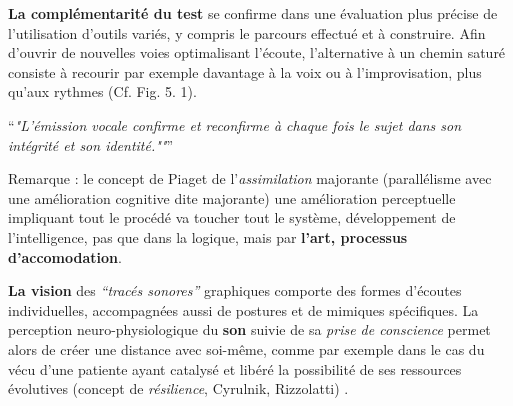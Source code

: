 
 \textbf{La complémentarité du test} se confirme dans une évaluation plus
 précise de l'utilisation d'outils variés, y compris  le parcours effectué et à
 construire.
 Afin d'ouvrir de nouvelles
 voies optimalisant l'écoute, l'alternative à un chemin saturé
 consiste à recourir par exemple davantage  à la voix ou à l'improvisation,
 plus qu'aux rythmes (Cf. Fig. 5. 1).

 \enquote{\emph{"L'émission vocale confirme et reconfirme à chaque
 fois le sujet dans son intégrité et son identité.""}}%
 \autocite{tomatis:loreille} %




  Remarque : le concept de Piaget de l'\textit{assimilation}
  majorante (parallélisme avec une amélioration cognitive dite majorante)
une amélioration perceptuelle impliquant tout le procédé va toucher tout le
système, développement de l'intelligence, pas que dans la logique, mais
par \textbf{l'art, processus d'accomodation}.


 \textbf{La vision}
des \textit{``tracés sonores''} graphiques comporte des formes
d'écoutes individuelles, accompagnées aussi de postures et de mimiques spécifiques.
La  perception
neuro-physiologique du \textbf{son} suivie de sa
 \textit{prise de conscience }
permet alors de créer une distance avec
soi-même, comme par exemple dans le cas
du vécu  d'une patiente ayant catalysé et libéré
la possibilité de ses ressources évolutives (concept de \textit{résilience}, Cyrulnik, Rizzolatti) \autocite[27--63]{van_eersel_cerveau}.


